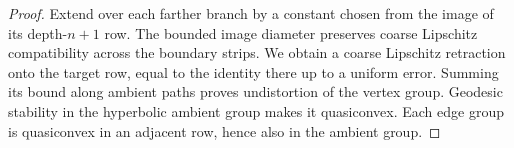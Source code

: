 \begin{proof}
Extend over each farther branch by a constant chosen from the image
of its depth-$n+1$ row. The bounded image diameter preserves coarse
Lipschitz compatibility across the boundary strips. We obtain a
coarse Lipschitz retraction onto the target row, equal to the identity
there up to a uniform error. Summing its bound along ambient
paths proves undistortion of the vertex group. Geodesic stability
in the hyperbolic ambient group makes it quasiconvex. Each edge
group is quasiconvex in an adjacent row, hence also in the ambient
group.
\end{proof}
